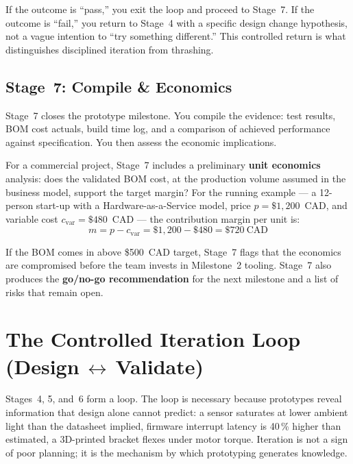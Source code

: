 If the outcome is ``pass,'' you exit the loop and proceed to Stage~7.
If the outcome is ``fail,'' you return to Stage~4 with a specific design
change hypothesis, not a vague intention to ``try something different.''
This controlled return is what distinguishes disciplined iteration from
thrashing.

\subsection{Stage~7: Compile \& Economics}
\label{sec:ch2-stage7}

Stage~7 closes the prototype milestone.
You compile the evidence: test results, BOM cost actuals, build time log,
and a comparison of achieved performance against specification.
You then assess the economic implications.

For a commercial project, Stage~7 includes a preliminary
\textbf{unit economics} analysis:
does the validated BOM cost, at the production volume assumed in the business
model, support the target margin?
For the running example --- a 12-person start-up with a
Hardware-as-a-Service model, price $p = \$1{,}200$~CAD, and variable cost
$c_{\text{var}} = \$480$~CAD --- the contribution margin per unit is:
\begin{equation}
  \label{eq:ch2-margin}
  m = p - c_{\text{var}} = \$1{,}200 - \$480 = \$720~\text{CAD}
\end{equation}

If the BOM comes in above \$500~CAD target, Stage~7 flags that the economics
are compromised before the team invests in Milestone~2 tooling.
Stage~7 also produces the \textbf{go/no-go recommendation}
for the next milestone and a list of risks that remain open.

\section{The Controlled Iteration Loop (Design\,$\leftrightarrow$\,Validate)}
\label{sec:ch2-loop}

Stages~4, 5, and~6 form a loop.
The loop is necessary because prototypes reveal information that design
alone cannot predict: a sensor saturates at lower ambient light than the
datasheet implied, firmware interrupt latency is 40\,\% higher than estimated,
a 3D-printed bracket flexes under motor torque.
Iteration is not a sign of poor planning; it is the mechanism by which
prototyping generates knowledge.

